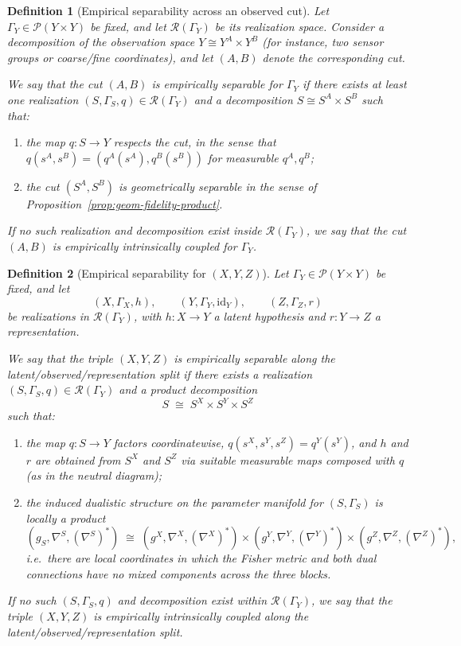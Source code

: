 \documentclass[11pt]{article}
\newtheorem{definition}{Definition}
\newcommand{\Pcal}{\mathcal{P}}
\begin{document}
\begin{definition}[Empirical separability across an observed cut]
\label{def:emp-separability-cut}
Let $\Gamma_Y \in \Pcal(Y\times Y)$ be fixed, and let
$\mathcal{R}(\Gamma_Y)$ be its realization space. Consider a decomposition of
the observation space $Y \cong Y^A \times Y^B$ (for instance, two
sensor groups or coarse/fine coordinates), and let $(A,B)$ denote the
corresponding cut.

We say that the cut $(A,B)$ is \emph{empirically separable} for
$\Gamma_Y$ if there exists at least one realization
$(S,\Gamma_S,q) \in \mathcal{R}(\Gamma_Y)$ and a decomposition
$S \cong S^A \times S^B$ such that:
\begin{enumerate}[label=(E\arabic*),leftmargin=1.8em]
  \item the map $q : S \to Y$ respects the cut, in the sense that
  $q(s^A,s^B) = (q^A(s^A),q^B(s^B))$ for measurable $q^A,q^B$;
  \item the cut $(S^A,S^B)$ is geometrically separable in the sense of
  Proposition~\ref{prop:geom-fidelity-product}.
\end{enumerate}

If no such realization and decomposition exist inside $\mathcal{R}(\Gamma_Y)$,
we say that the cut $(A,B)$ is \emph{empirically intrinsically coupled}
for $\Gamma_Y$.
\end{definition}

\begin{definition}[Empirical separability for $(X,Y,Z)$]
\label{def:emp-separability-XYZ}
Let $\Gamma_Y \in \Pcal(Y\times Y)$ be fixed, and let
\[
  (X,\Gamma_X,h),\qquad
  (Y,\Gamma_Y,\mathrm{id}_Y),\qquad
  (Z,\Gamma_Z,r)
\]
be realizations in $\mathcal{R}(\Gamma_Y)$, with $h:X\to Y$ a latent
hypothesis and $r:Y\to Z$ a representation.

We say that the triple $(X,Y,Z)$ is \emph{empirically separable along
the latent/observed/representation split} if there exists a realization
$(S,\Gamma_S,q)\in\mathcal{R}(\Gamma_Y)$ and a product decomposition
\[
  S \;\cong\; S^X \times S^Y \times S^Z
\]
such that:
\begin{enumerate}[label=(ES\arabic*),leftmargin=1.8em]
  \item the map $q : S \to Y$ factors coordinatewise,
  $q(s^X,s^Y,s^Z) = q^Y(s^Y)$, and $h$ and $r$ are obtained from
  $S^X$ and $S^Z$ via suitable measurable maps composed with $q$
  (as in the neutral diagram);
  \item the induced dualistic structure on the parameter manifold for
  $(S,\Gamma_S)$ is locally a product
  \[
    (g_S,\nabla^S,(\nabla^S)^\ast)
    \;\cong\;
    (g^X,\nabla^X,(\nabla^X)^\ast)
    \times
    (g^Y,\nabla^Y,(\nabla^Y)^\ast)
    \times
    (g^Z,\nabla^Z,(\nabla^Z)^\ast),
  \]
  i.e.\ there are local coordinates in which the Fisher metric and both
  dual connections have no mixed components across the three blocks.
\end{enumerate}

If no such $(S,\Gamma_S,q)$ and decomposition exist within
$\mathcal{R}(\Gamma_Y)$, we say that the triple $(X,Y,Z)$ is \emph{empirically
intrinsically coupled} along the latent/observed/representation split.
\end{definition}
\end{document}
